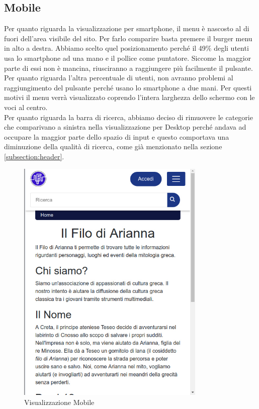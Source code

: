 \subsection{Mobile}
Per quanto riguarda la visualizzazione per smartphone, il menu è nascosto al di fuori dell'area visibile del sito. Per farlo comparire basta premere il burger menu in alto a destra. Abbiamo scelto quel posizionamento perché il 49\% degli utenti usa lo smartphone ad una mano e il pollice come puntatore. Siccome la maggior parte di essi non è mancina, riusciranno a raggiungere più facilmente il pulsante. Per quanto riguarda l'altra percentuale di utenti, non avranno problemi al raggiungimento del pulsante perché usano lo smartphone a due mani. Per questi motivi il menu verrà visualizzato coprendo l'intera larghezza dello schermo con le voci al centro.\\
Per quanto riguarda la barra di ricerca, abbiamo deciso di rimuovere le categorie che comparivano a sinistra nella visualizzazione per Desktop perché andava ad occupare la maggior parte dello spazio di input e questo comportava una diminuzione della qualità di ricerca, come già menzionato nella sezione \ref{subsection:header}.
\begin{figure}[H]
	\begin{center}
		\includegraphics[width=9cm]{img/mobile.jpg}
		\caption{Visualizzazione Mobile}
	\end{center}
\end{figure}
\pagebreak
